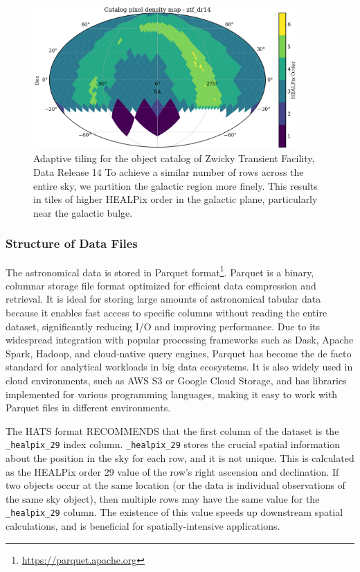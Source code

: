 \documentclass[11pt,a4paper]{ivoa}
\begin{document}
\begin{figure}
\centering
\includegraphics[width=0.9\textwidth]{order-pix.png}
\caption{Adaptive tiling for the object catalog of Zwicky Transient Facility, Data Release 14 \citep{ztf:Bellm2019, ztf:Masci2019} To achieve a similar number of rows across the entire sky, we partition the galactic region more finely. This results in tiles of higher HEALPix order in the galactic plane, particularly near the galactic bulge. }
\label{fig:order}
\end{figure}


\subsubsection{Structure of Data Files} \label{sec:parquet}
The astronomical data is stored in Parquet format\footnote{\href{https://parquet.apache.org}{https://parquet.apache.org}}.
Parquet is a binary, columnar storage file format optimized for efficient data compression and retrieval.
It is ideal for storing large amounts of astronomical tabular data because it enables fast access to specific columns without reading the entire dataset, significantly reducing I/O and improving performance.
Due to its widespread integration with popular processing frameworks such as Dask, Apache Spark, Hadoop, and cloud-native query engines, Parquet has become the de facto standard for analytical workloads in big data ecosystems.
It is also widely used in cloud environments, such as AWS S3 or Google Cloud Storage, and has libraries implemented for various programming languages, making it easy to work with Parquet files in different environments. \par

The HATS format RECOMMENDS that the first column of the dataset is the \texttt{\_healpix\_29} index column.  
\texttt{\_healpix\_29} stores the crucial spatial information about the position in the sky for each row, and it is not unique.
This is calculated as the HEALPix order 29 value of the row's right ascension and declination. 
If two objects occur at the same location (or the data is individual observations of the same sky object), then multiple rows may have the same value for the \texttt{\_healpix\_29} column.
The existence of this value speeds up downstream spatial calculations, and is beneficial for spatially-intensive applications.
\end{document}

